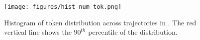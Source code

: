 \begin{figure}[htbp]
    \centering
    \texttt{[image: figures/hist\_num\_tok.png]}
    \caption{Histogram of token distribution across trajectories in \model. The red vertical line shows the ${90}^{th}$ percentile of the distribution.}
    \label{fig:hist_num_tok}
\end{figure}